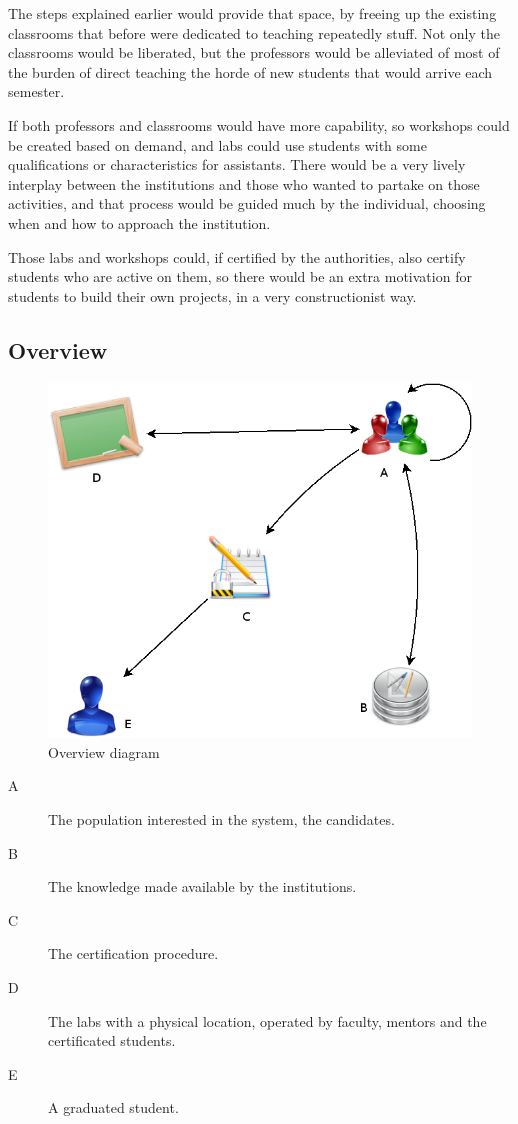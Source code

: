The steps explained earlier would provide that space, by freeing up the existing
classrooms that before were dedicated to teaching repeatedly stuff. Not only the
classrooms would be liberated, but the professors would be alleviated of most of
the burden of direct teaching the horde of new students that would arrive each
semester.   

If both professors and classrooms would have more capability, so workshops could
be created based on demand, and labs could use students with some
qualifications or characteristics for assistants. There would be a very lively
interplay between the institutions and those who wanted to partake on those
activities, and that process would be guided much by the individual, choosing
when and how to approach the institution. 

Those labs and workshops could, if certified by the authorities, also certify
students who are active on them, so there would be an extra motivation for
students to build their own projects, in a very constructionist way.

\clearpage

\subsection{Overview}

\begin{figure}[htb]
   \centering
   \includegraphics[width=1\columnwidth]{images/diagram.png}
   \caption{Overview diagram}
   \label{fig:overview_diagram}
\end{figure}


\begin{description}
    \item[A] The population interested in the system, the candidates.
    \item[B] The knowledge made available by the institutions.
    \item[C] The certification procedure.
    \item[D] The labs with a physical location, operated by faculty, mentors and the
    certificated students.
    \item[E] A graduated student.
\end{description}

